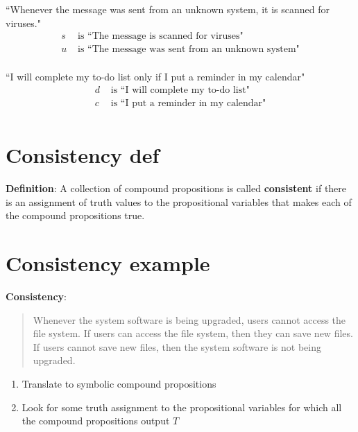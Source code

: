 \documentclass[12pt, oneside]{article}
\begin{document}
\begin{multicols}{2}
``Whenever the message was sent from an unknown system, it is scanned for viruses."
\columnbreak
\begin{align*}
s &\text{ is  ``The message is scanned for viruses"} \\
u &\text{ is  ``The message was sent from an unknown system"} \\
\end{align*}
\end{multicols}
\vfill

\begin{multicols}{2}
``I will complete my to-do list only if I put a reminder in my calendar"
\columnbreak
\begin{align*}
d &\text{ is  ``I will complete my to-do list"} \\
c &\text{ is  ``I put a reminder in my calendar"} \\
\end{align*}
\end{multicols}
\vfill \vfill
\section*{Consistency def}


{\bf Definition}: A collection of  compound  propositions
is called {\bf consistent} if  there
is  an assignment  of  truth values
to  the  propositional variables that makes
each of the compound propositions  true.
 \vfill
\section*{Consistency example}


{\bf Consistency}: 
\begin{quote}
Whenever the system software is being upgraded, users cannot access the file system. 
If users can access the file system, then they can save new files. 
If users cannot save new files, then the system software is not being upgraded.
\end{quote}

\begin{enumerate}
\item Translate to symbolic compound propositions
\vfill
\item Look for some truth assignment to the propositional variables for which all the compound propositions output $T$
\vfill
\end{enumerate} \vfill
\end{document}
